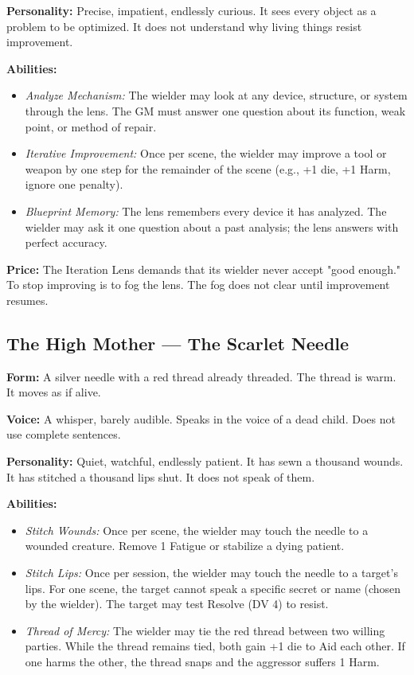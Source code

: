 \noindent\textbf{Personality:} Precise, impatient, endlessly curious. It sees every object as a problem to be optimized. It does not understand why living things resist improvement.

\noindent\textbf{Abilities:}
\begin{itemize}
\item \textit{Analyze Mechanism:} The wielder may look at any device, structure, or system through the lens. The GM must answer one question about its function, weak point, or method of repair.
\item \textit{Iterative Improvement:} Once per scene, the wielder may improve a tool or weapon by one step for the remainder of the scene (e.g., +1 die, +1 Harm, ignore one penalty).
\item \textit{Blueprint Memory:} The lens remembers every device it has analyzed. The wielder may ask it one question about a past analysis; the lens answers with perfect accuracy.
\end{itemize}

\noindent\textbf{Price:} The Iteration Lens demands that its wielder never accept "good enough." To stop improving is to fog the lens. The fog does not clear until improvement resumes.

\subsection{The High Mother — The Scarlet Needle}

\noindent\textbf{Form:} A silver needle with a red thread already threaded. The thread is warm. It moves as if alive.

\noindent\textbf{Voice:} A whisper, barely audible. Speaks in the voice of a dead child. Does not use complete sentences.

\noindent\textbf{Personality:} Quiet, watchful, endlessly patient. It has sewn a thousand wounds. It has stitched a thousand lips shut. It does not speak of them.

\noindent\textbf{Abilities:}
\begin{itemize}
\item \textit{Stitch Wounds:} Once per scene, the wielder may touch the needle to a wounded creature. Remove 1 Fatigue or stabilize a dying patient.
\item \textit{Stitch Lips:} Once per session, the wielder may touch the needle to a target's lips. For one scene, the target cannot speak a specific secret or name (chosen by the wielder). The target may test Resolve (DV 4) to resist.
\item \textit{Thread of Mercy:} The wielder may tie the red thread between two willing parties. While the thread remains tied, both gain +1 die to Aid each other. If one harms the other, the thread snaps and the aggressor suffers 1 Harm.
\end{itemize}

